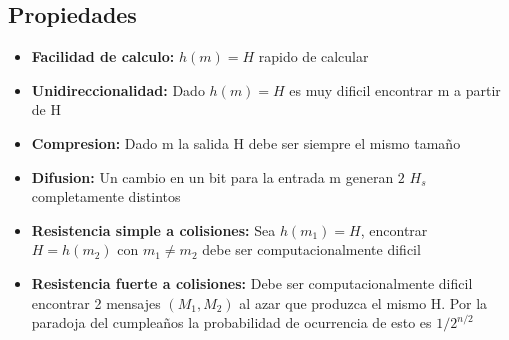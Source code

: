 \documentclass{article}
\newcommand{\SP}{\,\,}
\begin{document}
\subsection{Propiedades}
\begin{itemize}
    \item \textbf{Facilidad de calculo:} $h(m) = H$ rapido de calcular
    \item \textbf{Unidireccionalidad:} Dado $h(m) = H$ es muy dificil encontrar m a partir de H
    \item \textbf{Compresion:} Dado m la salida H debe ser siempre el mismo tamaño
    \item \textbf{Difusion:} Un cambio en un bit para la entrada m generan $2 \SP H_{s}$ completamente distintos
    \item \textbf{Resistencia simple a colisiones:} Sea $h(m_{1}) = H$, encontrar $H = h(m_{2})$ con $m_{1} \neq m_{2}$ debe ser
    computacionalmente dificil
    \item \textbf{Resistencia fuerte a colisiones:} Debe ser computacionalmente dificil encontrar 2 mensajes $(M_{1}, M_{2})$ al azar
    que produzca el mismo H. Por la paradoja del cumpleaños la probabilidad de ocurrencia
    de esto es $1/2^{n/2}$
\end{itemize}
\end{document}
